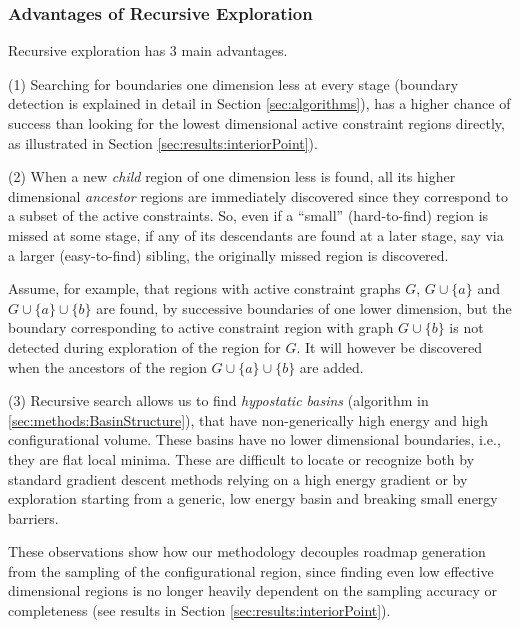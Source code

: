 \documentclass[]{article}
\begin{document}
\subsubsection{Advantages of Recursive Exploration}
\label{sec:advantagesRS}
Recursive exploration has 3 main advantages.

(1) Searching for boundaries one dimension less at every
stage (boundary detection is explained in detail in Section
\ref{sec:algorithms}), has a higher chance of success than looking
for the lowest dimensional active constraint regions directly, as
illustrated in Section \ref{sec:results:interiorPoint}). 

(2) When a new \emph{child} region of one dimension less is found, all its
higher dimensional \emph{ancestor} regions are immediately discovered since
they correspond to a subset of the active constraints.  So, even if a ``small''
(hard-to-find) region is missed at some stage, if any of its descendants are
found at a later stage, say via a larger (easy-to-find) sibling, the originally
missed region is discovered.

Assume, for example, that regions with active constraint graphs $G$, $G \cup
\{a\}$ and $G \cup \{a\} \cup \{b\}$ are found, by successive boundaries of one
lower dimension, but the boundary corresponding to active constraint region
with graph $G \cup \{b\}$ is not detected during exploration of the region for $G$.
It will however be discovered when the ancestors of the region $G \cup \{a\}
\cup \{b\}$ are added.


(3)  Recursive search allows us to find \emph{hypostatic basins} (algorithm in
\ref{sec:methods:BasinStructure}), that have non-generically high energy and
high configurational volume. These basins have no lower dimensional boundaries,
i.e., they are flat local minima. These are difficult to locate or recognize
both by standard gradient descent methods relying on a high energy gradient or by
exploration starting from a generic, low energy basin and breaking small energy
barriers.

These observations show how our methodology decouples roadmap generation from
the sampling of the configurational region, since finding even low effective
dimensional regions is no longer heavily dependent on the sampling accuracy or
completeness (see results in Section \ref{sec:results:interiorPoint}).
\end{document}
